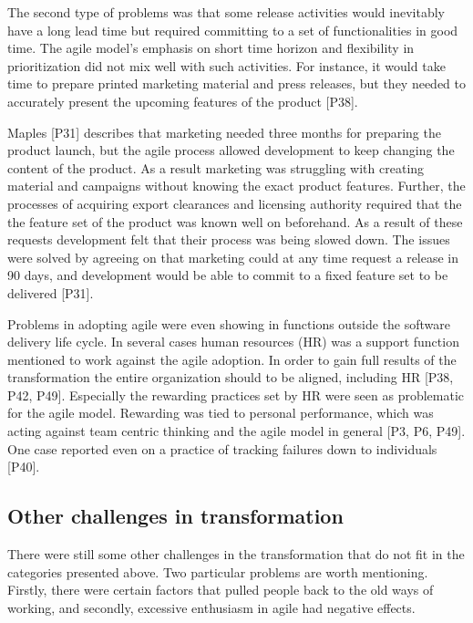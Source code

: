 The second type of problems was that some release activities would inevitably
have a long lead time but required committing to a set of functionalities in
good time. The agile model's emphasis on short time horizon and flexibility in
prioritization did not mix well with such activities.
For instance, it would take time to prepare printed marketing material and press
releases, but they needed to accurately present the upcoming features of the
product [P38].

Maples [P31] describes that marketing needed three months for preparing the
product launch, but the agile process allowed development to keep changing the
content of the product. As a result marketing was struggling with creating
material and campaigns without knowing the exact product features. Further, the
processes of acquiring export clearances and licensing authority required that
the the feature set of the product was known well on beforehand.
As a result of these requests development felt that their process was being
slowed down. The issues were solved by agreeing on that marketing could at any
time request a release in 90 days, and development would be able to commit to a
fixed feature set to be delivered [P31].


Problems in adopting agile were even showing in functions outside the software
delivery life cycle. In several cases human resources (HR) was a support function
mentioned to work against the agile adoption. In order to gain full results of
the transformation the entire organization should to be aligned, including HR
[P38, P42, P49].
Especially the rewarding practices set by HR were seen as problematic for the
agile model. Rewarding was tied to personal performance, which was acting
against team centric thinking and the agile model in general [P3, P6, P49].
One case reported even on a practice of tracking failures down to individuals
[P40].


\subsection{Other challenges in transformation}

There were still some other challenges in the transformation that do not fit in
the categories presented above. Two particular problems are worth mentioning.
Firstly, there were certain factors that pulled people back to the old ways of
working, and secondly, excessive enthusiasm in agile had negative effects.

